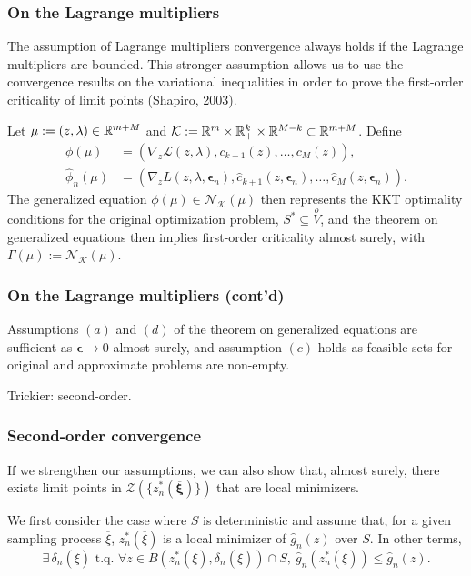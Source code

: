 \documentclass{beamer}
\def\bxi{\boldsymbol\xi}
\def\bepsilon{\boldsymbol\epsilon}
\begin{document}
\begin{frame}
\frametitle{On the Lagrange multipliers}

The assumption of Lagrange multipliers convergence always holds if the Lagrange multipliers are bounded.
This stronger assumption allows us to use the convergence results on the variational inequalities in order to prove the first-order criticality of limit points (Shapiro, 2003).

\mbox{}

Let $\mu := (z,\lambda) \in \mathbb{R}^{m+M}$ and $\mathcal{K} := \mathbb{R}^m
\times \mathbb{R}^k_+ \times \mathbb{R}^{M-k} \subset \mathbb{R}^{m+M}$.
Define
\begin{align*}
\phi(\mu) &= \left( \nabla_z \mathcal{L}(z, \lambda), c_{k+1}(z),
\ldots, c_M(z) \right),\\
\hat{\phi}_n(\mu) &= \left( \nabla_z L(z, \lambda, \bepsilon_n),
\hat{c}_{k+1}(z, \bepsilon_n), \ldots, \hat{c}_{M}(z,
\bepsilon_n)\right).
\end{align*}
The generalized equation $\phi(\mu) \in \mathcal{N}_{\mathcal{K}}(\mu)$ then represents the KKT optimality conditions for the original optimization problem, $S^* \subseteq \overset{o}{V}$, and the theorem on generalized equations then implies first-order criticality almost surely, with $\Gamma(\mu) := \mathcal{N}_{\mathcal{K}}(\mu)$.

\end{frame}

\begin{frame}
\frametitle{On the Lagrange multipliers (cont'd)}

Assumptions $(a)$ and $(d)$ of the theorem on generalized equations are sufficient as $\bepsilon \rightarrow 0$ almost surely, and assumption $(c)$ holds as feasible sets for original and approximate problems are non-empty.

\mbox{}

Trickier: second-order.

\end{frame}

\begin{frame}
\frametitle{Second-order convergence}

If we strengthen our assumptions, we can also show that, almost surely, there exists limit points in $\mathcal{Z}\left(\lbrace z^*_n(\overline{\bxi})\rbrace\right)$ that are local minimizers.

\mbox{}

We first consider the case where $S$ is deterministic and assume that, for a given sampling process $\overline{\xi}$, $z_n^*(\overline{\xi})$ is a local minimizer of $\hat{g}_n(z)$ over $S$.
In other terms,
\[
\exists\, \delta_n(\overline{\xi}) \text{ t.q. } \forall z \in
B \left( z_n^*(\overline{\xi}), \delta_n(\overline{\xi}) \right) \cap
S,\ \hat{g}_n \left( z_n^*(\overline{\xi}) \right) \leq \hat{g}_n(z).
\]

\end{frame}
\end{document}

